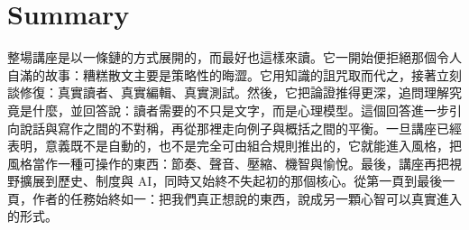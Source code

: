 \section{Summary}

整場講座是以一條鏈的方式展開的，而最好也這樣來讀。它一開始便拒絕那個令人自滿的故事：糟糕散文主要是策略性的晦澀。它用知識的詛咒取而代之，接著立刻談修復：真實讀者、真實編輯、真實測試。然後，它把論證推得更深，追問理解究竟是什麼，並回答說：讀者需要的不只是文字，而是心理模型。這個回答進一步引向說話與寫作之間的不對稱，再從那裡走向例子與概括之間的平衡。一旦講座已經表明，意義既不是自動的，也不是完全可由組合規則推出的，它就能進入風格，把風格當作一種可操作的東西：節奏、聲音、壓縮、機智與愉悅。最後，講座再把視野擴展到歷史、制度與 AI，同時又始終不失起初的那個核心。從第一頁到最後一頁，作者的任務始終如一：把我們真正想說的東西，說成另一顆心智可以真實進入的形式。